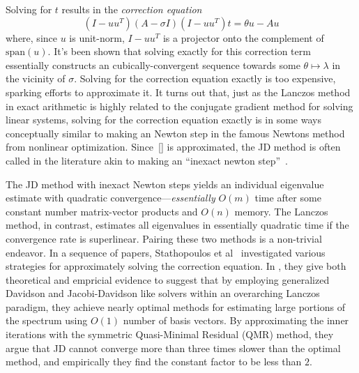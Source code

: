 \documentclass[10pt]{article}
\numberwithin{equation}{section}
\newcommand{\+}{%
	\raisebox{0.18ex}{\scaleobj{0.55}{+}}
}
\theoremstyle{definition}
\begin{document}
Solving for $t$ results in the \emph{correction equation}
\begin{equation}
	(I - u u^T)(A - \sigma I )(I - u u^T) t = \theta u - A u 
\end{equation}
where, since $u$ is unit-norm, $I - u u^T$ is a projector onto the complement of $\mathrm{span}(u)$. 
It's been shown that solving exactly for this correction term essentially constructs an cubically-convergent sequence towards some $\theta \mapsto \lambda$ in the vicinity of $\sigma$. Solving for the correction equation exactly is too expensive, sparking efforts to approximate it. It turns out that, just as the Lanczos method in exact arithmetic is highly related to the conjugate gradient method for solving linear systems, solving for the correction equation exactly is in some ways conceptually similar to making an Newton step in the famous Newtons method from nonlinear optimization. Since~\eqref{} is approximated, the JD method is often called in the literature akin to making an ``inexact newton step''~\cite{}.


The JD method with inexact Newton steps yields an individual eigenvalue estimate with quadratic convergence---\emph{essentially} $O(m)$ time after some constant number matrix-vector products and $O(n)$ memory.
The Lanczos method, in contrast, estimates all eigenvalues in essentially quadratic time if the convergence rate is superlinear. Pairing these two methods is a non-trivial endeavor. 
In a sequence of papers, Stathopoulos et al~\cite{} investigated various strategies for approximately solving the correction equation. 
In , they give both theoretical and empricial evidence to suggest that by employing generalized Davidson and Jacobi-Davidson like solvers within an overarching Lanczos paradigm, they achieve nearly optimal methods for estimating large portions of the spectrum using $O(1)$ number of basis vectors. By approximating the inner iterations with the symmetric Quasi-Minimal Residual (QMR) method, they argue that JD cannot converge more than three times slower than the optimal method, and empirically they find the constant factor to be less than $2$. 

\end{document}
